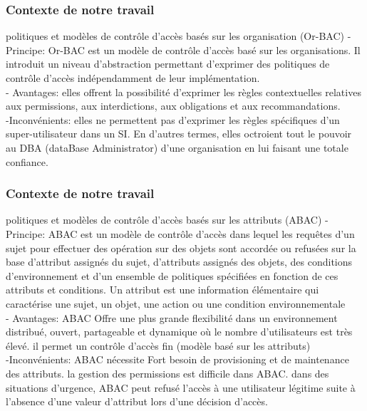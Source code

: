 \documentclass[10pt]{beamer}
\begin{document}
\begin{frame}
 \frametitle{Contexte de notre travail}
  \begin{block}{ politiques et modèles de contrôle d'accès basés sur les organisation (Or-BAC)}
    - Principe: Or-BAC est un modèle de contrôle d'accès basé sur les organisations. Il introduit un niveau d'abstraction permettant d'exprimer des politiques de contrôle d'accès indépendamment de leur implémentation. \\ 
    - Avantages: elles offrent la possibilité d'exprimer les règles contextuelles relatives aux permissions, aux interdictions, aux obligations et aux recommandations.\\
    -Inconvénients: elles ne permettent pas d'exprimer les règles spécifiques d'un super-utilisateur dans un SI. En d'autres termes, elles octroient tout le pouvoir au DBA (dataBase Administrator) d'une organisation en lui faisant une totale confiance. 
  \end{block}
\end{frame}

\begin{frame}
 \frametitle{Contexte de notre travail}
  \begin{block}{ politiques et modèles de contrôle d'accès basés sur les attributs (ABAC)}
    - Principe: ABAC est un modèle de contrôle d'accès dans lequel les requêtes d'un sujet pour effectuer des opération sur des objets sont accordée ou refusées sur la base d'attribut assignés du sujet, d'attributs assignés des objets, des conditions d'environnement et d'un ensemble de politiques spécifiées en fonction de ces attributs et conditions. Un attribut est une information élémentaire qui caractérise une sujet, un objet, une action ou une condition environnementale\\
    - Avantages: ABAC Offre une plus grande flexibilité dans un environnement distribué, ouvert, partageable et dynamique où le nombre d'utilisateurs est très élevé. il permet un contrôle d'accès fin (modèle basé sur les attributs)\\
    -Inconvénients: ABAC nécessite Fort besoin de provisioning et de maintenance des attributs. la gestion des permissions est difficile dans ABAC. dans des situations d'urgence, ABAC peut refusé l'accès à une utilisateur légitime suite à l'absence d'une valeur d'attribut lors d'une décision d'accès.
 
  \end{block}
\end{frame}
\end{document}
